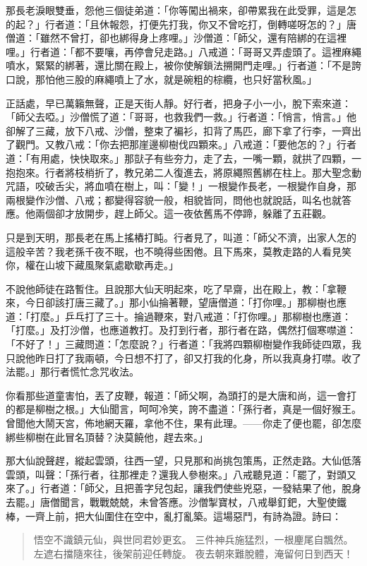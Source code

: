 那長老淚眼雙垂，怨他三個徒弟道：「你等闖出禍來，卻帶累我在此受罪，這是怎的起？」行者道：「且休報怨，打便先打我，你又不曾吃打，倒轉嗟呀怎的？」唐僧道：「雖然不曾打，卻也綁得身上疼哩。」沙僧道：「師父，還有陪綁的在這裡哩。」行者道：「都不要嚷，再停會兒走路。」八戒道：「哥哥又弄虛頭了。這裡麻繩噴水，緊緊的綁著，還比關在殿上，被你使解鎖法搠開門走哩。」行者道：「不是誇口說，那怕他三股的麻繩噴上了水，就是碗粗的棕纜，也只好當秋風。」

正話處，早已萬籟無聲，正是天街人靜。好行者，把身子小一小，脫下索來道：「師父去啞。」沙僧慌了道：「哥哥，也救我們一救。」行者道：「悄言，悄言。」他卻解了三藏，放下八戒、沙僧，整束了褊衫，扣背了馬匹，廊下拿了行李，一齊出了觀門。又教八戒：「你去把那崖邊柳樹伐四顆來。」八戒道：「要他怎的？」行者道：「有用處，快快取來。」那獃子有些夯力，走了去，一嘴一顆，就拱了四顆，一抱抱來。行者將枝梢折了，教兄弟二人復進去，將原繩照舊綁在柱上。那大聖念動咒語，咬破舌尖，將血噴在樹上，叫：「變！」一根變作長老，一根變作自身，那兩根變作沙僧、八戒；都變得容貌一般，相貌皆同，問他也就說話，叫名也就答應。他兩個卻才放開步，趕上師父。這一夜依舊馬不停蹄，躲離了五莊觀。

只是到天明，那長老在馬上搖樁打盹。行者見了，叫道：「師父不濟，出家人怎的這般辛苦？我老孫千夜不眠，也不曉得些困倦。且下馬來，莫教走路的人看見笑你，權在山坡下藏風聚氣處歇歇再走。」

不說他師徒在路暫住。且說那大仙天明起來，吃了早齋，出在殿上，教：「拿鞭來，今日卻該打唐三藏了。」那小仙掄著鞭，望唐僧道：「打你哩。」那柳樹也應道：「打麼。」乒乓打了三十。掄過鞭來，對八戒道：「打你哩。」那柳樹也應道：「打麼。」及打沙僧，也應道教打。及打到行者，那行者在路，偶然打個寒噤道：「不好了！」三藏問道：「怎麼說？」行者道：「我將四顆柳樹變作我師徒四眾，我只說他昨日打了我兩頓，今日想不打了，卻又打我的化身，所以我真身打噤。收了法罷。」那行者慌忙念咒收法。

你看那些道童害怕，丟了皮鞭，報道：「師父啊，為頭打的是大唐和尚，這一會打的都是柳樹之根。」大仙聞言，呵呵冷笑，誇不盡道：「孫行者，真是一個好猴王。曾聞他大鬧天宮，佈地網天羅，拿他不住，果有此理。——你走了便也罷，卻怎麼綁些柳樹在此冒名頂替？決莫饒他，趕去來。」

那大仙說聲趕，縱起雲頭，往西一望，只見那和尚挑包策馬，正然走路。大仙低落雲頭，叫聲：「孫行者，往那裡走？還我人參樹來。」八戒聽見道：「罷了，對頭又來了。」行者道：「師父，且把善字兒包起，讓我們使些兇惡，一發結果了他，脫身去罷。」唐僧聞言，戰戰兢兢，未曾答應。沙僧掣寶杖，八戒舉釘鈀，大聖使鐵棒，一齊上前，把大仙圍住在空中，亂打亂築。這場惡鬥，有詩為證。詩曰：
\begin{quote}
悟空不識鎮元仙，與世同君妙更玄。
三件神兵施猛烈，一根麈尾自飄然。
左遮右擋隨來往，後架前迎任轉旋。
夜去朝來難脫體，淹留何日到西天！
\end{quote}

